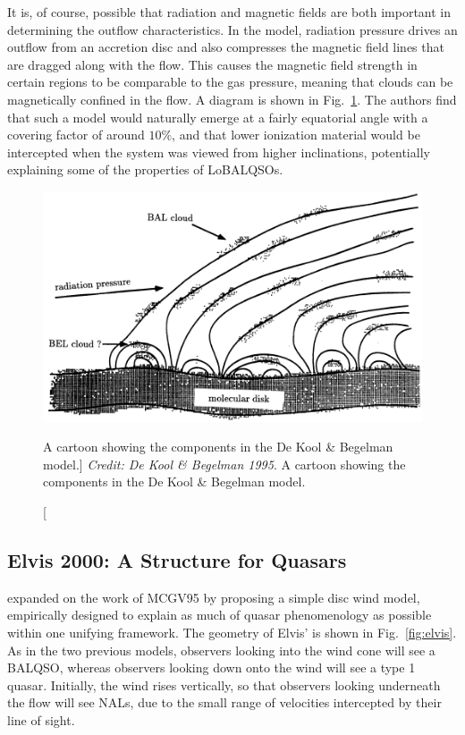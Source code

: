It is, of course, possible that radiation and magnetic fields are both important
in determining the outflow characteristics. In the \cite{dekool1995} model, radiation
pressure drives an outflow from an accretion disc and also compresses the magnetic
field lines that are dragged along with the flow. This causes the magnetic field
strength in certain regions to be comparable to the gas pressure, meaning that clouds
can be magnetically confined in the flow. A diagram is shown in Fig.~\ref{fig:dekool}.
The authors find that such a model would naturally emerge at a fairly equatorial
angle with a covering factor of around $10\%$, and that lower ionization material 
would be intercepted when the system was viewed from higher inclinations, potentially
explaining some of the properties of LoBALQSOs.

\begin{figure}
\centering
\includegraphics[width=1.0\textwidth]{figures/02-outflows/dekool.png}
\caption
[A cartoon showing the components in the De Kool \& Begelman model.]
{
{\sl Credit: De Kool \& Begelman 1995}. 
A cartoon showing the components in the De Kool \& Begelman model.
} 
\label{fig:dekool}
\end{figure}


\subsection{Elvis 2000: A Structure for Quasars}

\cite{elvis2000} expanded on the work of MCGV95 by proposing a simple
disc wind model, empirically designed to explain as much of quasar phenomenology
as possible within one unifying framework. The geometry of Elvis'
is shown in Fig.~\ref{fig:elvis}. As in the two previous models, observers 
looking into the wind cone will see a BALQSO, whereas observers looking down onto
the wind will see a type 1 quasar. Initially, the wind rises vertically, so
that observers looking underneath the flow will see NALs,
due to the small range of velocities intercepted by their line of sight. 

